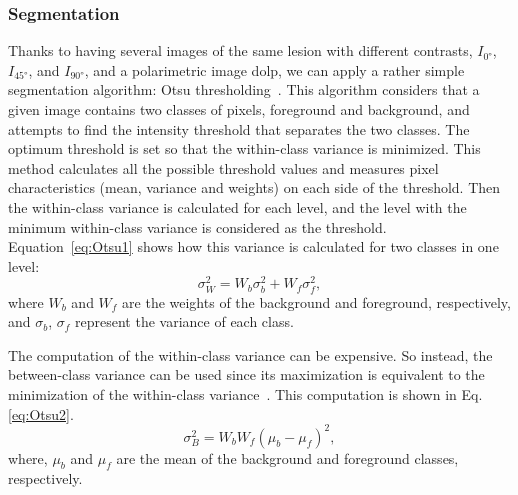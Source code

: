 \subsubsection{Segmentation}
Thanks to having several images of the same lesion with different contrasts, $I_{\ang{0}}$, $I_{\ang{45}}$, and $I_{\ang{90}}$, and a polarimetric image \ac{dolp}, we can apply a rather simple segmentation algorithm: Otsu thresholding~\cite{otsu1975threshold}. 
This algorithm considers that a given image contains two classes of pixels, foreground and background, and attempts to find the intensity threshold that separates the two classes.
The optimum threshold is set so that the within-class variance is minimized.
This method calculates all the possible threshold values and measures pixel characteristics (mean, variance and weights) on each side of the threshold. 
Then the within-class variance is calculated for each level, and the level with the minimum within-class variance is considered as the threshold.
Equation~\ref{eq:Otsu1} shows how this variance is calculated for two classes in one level:
\begin{equation}
	\sigma_{W}^{2} = W_{b}\sigma_{b}^{2} + W_{f}\sigma_{f}^{2},
	\label{eq:Otsu1}
\end{equation}
\noindent where $W_{b}$ and $W_{f}$ are the weights of the background and foreground, respectively, and $\sigma_{b}$, $\sigma_{f}$ represent the variance of each class.

The computation of the within-class variance can be expensive.
So instead, the between-class variance can be used since its maximization is equivalent to the minimization of the within-class variance~\cite{otsu1975threshold}.
This computation is shown in Eq.\,\ref{eq:Otsu2}.
\begin{equation}
	\sigma_{B}^{2} = W_{b}W_{f}(\mu_{b}-\mu_{f})^{2},
	\label{eq:Otsu2}
\end{equation}
\noindent where, $\mu_{b}$ and $\mu_{f}$ are the mean of the background and foreground classes, respectively.

